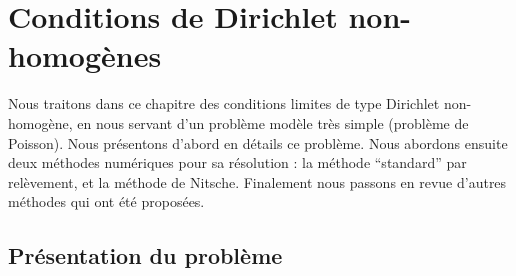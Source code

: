 \documentclass[11pt]{book}
\begin{document}
\chapter{Conditions de Dirichlet non-homogènes}

Nous traitons dans ce chapitre des conditions limites de type Dirichlet non-homogène, en nous servant d'un problème modèle très simple (problème de Poisson). Nous présentons d'abord en détails ce problème. Nous abordons ensuite deux méthodes numériques pour sa résolution : la méthode ``standard'' par relèvement, et la méthode de Nitsche.
Finalement nous passons en revue d'autres méthodes qui ont été proposées.

\section{Présentation du problème}
\end{document}
